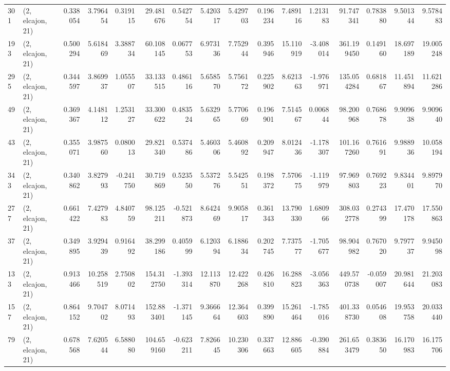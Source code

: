 \begin{tabular}{llrrrrrrrrrrrrrr}
301 &  (2, elcajon, 21) &   0.338054 &   3.796454 &   0.319115 &    29.481676 &   0.542754 &   5.420317 &   5.429703 &  0.196234 &   7.489116 &   1.213183 &    91.747341 &  0.783880 &   9.501344 &   9.578483 \\
193 &  (2, elcajon, 21) &   0.500294 &   5.618469 &   3.388734 &    60.108145 &   0.067753 &   6.973136 &   7.752944 &  0.395946 &  15.110919 &  -3.408014 &   361.199450 &  0.149160 &  18.697189 &  19.005248 \\
295 &  (2, elcajon, 21) &   0.344597 &   3.869937 &   1.055507 &    33.133515 &   0.486116 &   5.658570 &   5.756172 &  0.225902 &   8.621363 &  -1.976971 &   135.054284 &  0.681867 &  11.451894 &  11.621286 \\
49  &  (2, elcajon, 21) &   0.369367 &   4.148112 &   1.253127 &    33.300622 &   0.483524 &   5.632965 &   5.770669 &  0.196901 &   7.514567 &   0.006844 &    98.200968 &  0.768678 &   9.909638 &   9.909640 \\
43  &  (2, elcajon, 21) &   0.355071 &   3.987560 &   0.080013 &    29.821340 &   0.537486 &   5.460306 &   5.460892 &  0.209947 &   8.012436 &  -1.178307 &   101.167260 &  0.761691 &   9.988936 &  10.058194 \\
343 &  (2, elcajon, 21) &   0.340862 &   3.827993 &  -0.241750 &    30.719869 &   0.523550 &   5.537276 &   5.542551 &  0.198372 &   7.570675 &  -1.119979 &    97.969803 &  0.769223 &   9.834401 &   9.897970 \\
277 &  (2, elcajon, 21) &   0.661422 &   7.427983 &   4.840759 &    98.125211 &  -0.521873 &   8.642469 &   9.905817 &  0.361343 &  13.790330 &   1.680966 &   308.032778 &  0.274399 &  17.470178 &  17.550863 \\
37  &  (2, elcajon, 21) &   0.349895 &   3.929439 &   0.916492 &    38.299186 &   0.405999 &   6.120394 &   6.188634 &  0.202745 &   7.737577 &  -1.705677 &    98.904982 &  0.767020 &   9.797737 &   9.945098 \\
133 &  (2, elcajon, 21) &   0.913466 &  10.258519 &   2.750802 &   154.312750 &  -1.393314 &  12.113870 &  12.422268 &  0.426810 &  16.288823 &  -3.056363 &   449.570738 & -0.059007 &  20.981644 &  21.203083 \\
157 &  (2, elcajon, 21) &   0.864152 &   9.704702 &   8.071493 &   152.883401 &  -1.371145 &   9.366664 &  12.364603 &  0.399890 &  15.261464 &  -1.785016 &   401.338730 &  0.054608 &  19.953758 &  20.033440 \\
79  &  (2, elcajon, 21) &   0.678568 &   7.620544 &   6.588080 &   104.659160 &  -0.623211 &   7.826645 &  10.230306 &  0.337663 &  12.886605 &  -0.390884 &   261.653479 &  0.383650 &  16.170983 &  16.175706 \\

\end{tabular}
